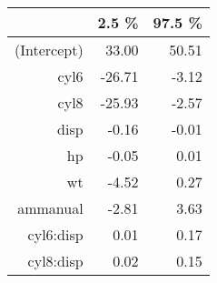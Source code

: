 \begin{tabular}{rrr}
  \hline
 & 2.5 \% & 97.5 \% \\ 
  \hline
(Intercept) & 33.00 & 50.51 \\ 
  cyl6 & -26.71 & -3.12 \\ 
  cyl8 & -25.93 & -2.57 \\ 
  disp & -0.16 & -0.01 \\ 
  hp & -0.05 & 0.01 \\ 
  wt & -4.52 & 0.27 \\ 
  ammanual & -2.81 & 3.63 \\ 
  cyl6:disp & 0.01 & 0.17 \\ 
  cyl8:disp & 0.02 & 0.15 \\ 
   \hline
\end{tabular}
